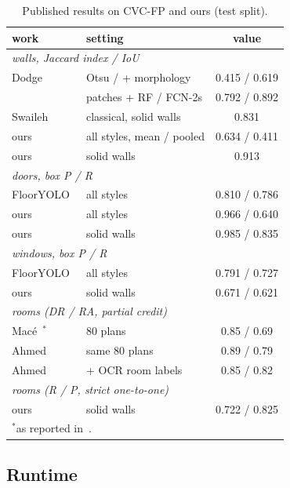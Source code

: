 \documentclass[conference]{IEEEtran}
\begin{document}
\begin{table}[t]
\centering
\caption{Published results on CVC-FP and ours (test split).}
\label{tab:literature}
\setlength{\tabcolsep}{3pt}
\small
\begin{tabular}{llc}
\toprule
work & setting & value \\
\midrule
\multicolumn{3}{l}{\emph{walls, Jaccard index / IoU}} \\
Dodge~\cite{dodge2017parsing} & Otsu / + morphology & 0.415 / 0.619 \\
 & patches + RF / FCN-2s & 0.792 / 0.892 \\
Swaileh~\cite{swaileh2021versailles} & classical, solid walls & 0.831 \\
ours & all styles, mean / pooled & 0.634 / 0.411 \\
ours & solid walls & 0.913 \\
\midrule
\multicolumn{3}{l}{\emph{doors, box P / R}} \\
FloorYOLO~\cite{santhosh2026flooryolo} & all styles & 0.810 / 0.786 \\
ours & all styles & 0.966 / 0.640 \\
ours & solid walls & 0.985 / 0.835 \\
\midrule
\multicolumn{3}{l}{\emph{windows, box P / R}} \\
FloorYOLO~\cite{santhosh2026flooryolo} & all styles & 0.791 / 0.727 \\
ours & solid walls & 0.671 / 0.621 \\
\midrule
\multicolumn{3}{l}{\emph{rooms (DR / RA, partial credit)}} \\
Mac\'e~\cite{mace2010rooms}$^\ast$ & 80 plans & 0.85 / 0.69 \\
Ahmed~\cite{ahmed2011improved} & same 80 plans & 0.89 / 0.79 \\
Ahmed~\cite{ahmed2012rooms} & + OCR room labels & 0.85 / 0.82 \\
\multicolumn{3}{l}{\emph{rooms (R / P, strict one-to-one)}} \\
ours & solid walls & 0.722 / 0.825 \\
\bottomrule
\multicolumn{3}{l}{\footnotesize $^\ast$as reported in~\cite{ahmed2011improved}.}
\end{tabular}
\end{table}

\subsection{Runtime}
\end{document}
